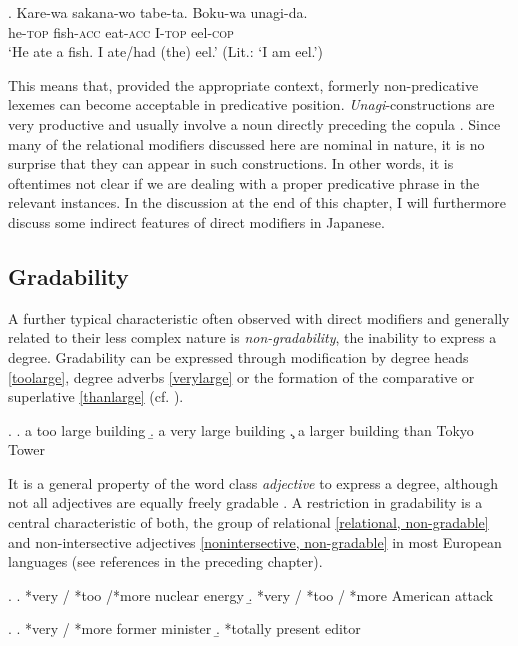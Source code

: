 \documentclass [output=book,colorlinks,citecolor=brown]{langscibook}
\begin{document}
\exg. Kare-wa sakana-wo tabe-ta. Boku-wa unagi-da.\\
he-\textsc{top} fish-\textsc{acc} eat-\textsc{acc} I-\textsc{top} eel-\textsc{cop}\\
`He ate a fish. I ate/had (the) eel.’ (Lit.: `I am eel.’) \label{eel-sentence}

This means that, provided the appropriate context, formerly non-predicative lexemes can become acceptable in predicative position. \textit{Unagi}-constructions are very productive and usually involve a noun directly preceding the copula \citep[23–29]{okutsu:1978:boku}. Since many of the relational modifiers discussed here are nominal in nature, it is no surprise that they can appear in such constructions. In other words, it is oftentimes not clear if we are dealing with a proper predicative phrase in the relevant instances. In the discussion at the end of this chapter, I will furthermore discuss some indirect features of direct modifiers in Japanese.

\subsection{Gradability} \label{gradability}

A further typical characteristic often observed with direct modifiers and generally related to their less complex nature is \textit{non-gradability}, the inability to express a degree. Gradability can be expressed through modification by degree heads \ref{toolarge}, degree adverbs \ref{verylarge} or the formation of the comparative or superlative \ref{thanlarge} (cf. \citealt{baker:2003:cat}). %

\ex. \a. a too large building \label{toolarge}
\b. a very large building \label{verylarge}
\c. a larger building than Tokyo Tower \label{thanlarge}

It is a general property of the word class \textit{adjective} to express a degree, although not all adjectives are equally freely gradable \citep[70–74]{dixon:2010:grammatical}. A restriction in gradability is a central characteristic of both, the group of relational \ref{relational, non-gradable} and non-intersective adjectives \ref{nonintersective, non-gradable} in most European languages (see references in the preceding chapter). %

\ex. \label{relational, non-gradable} \a. *very / *too /*more nuclear energy
\b. *very / *too / *more American attack

\ex. \label{nonintersective, non-gradable} \a. *very / *more former minister
\b. *totally present editor
\end{document}
